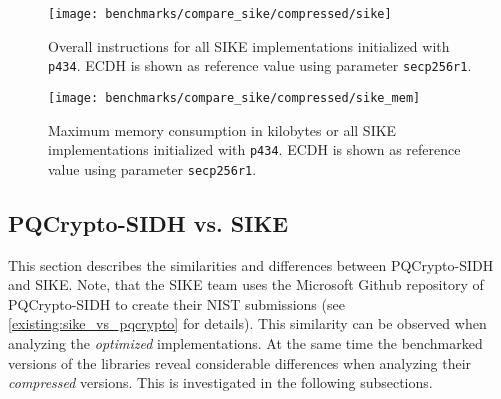 \begin{figure}[H]
  \centering
  \texttt{[image: benchmarks/compare\_sike/compressed/sike]}
  \caption[Instructions  of \gls{SIKE} implementations]
  {Overall instructions for all \gls{SIKE} implementations initialized with \texttt{p434}. \gls{ECDH} is shown as reference value using parameter \texttt{secp256r1}.}
  \label{fig:results_sike}
\end{figure}

\begin{figure}[H]
  \centering
  \texttt{[image: benchmarks/compare\_sike/compressed/sike\_mem]}
  \caption[Memory consumption of \gls{SIKE} implementations]
  {Maximum memory consumption in kilobytes or all \gls{SIKE} implementations initialized with \texttt{p434}. \gls{ECDH} is shown as reference value using parameter \texttt{secp256r1}.}
  \label{fig:results_sike_mem}
\end{figure}

\subsection{\gls{PQCrypto-SIDH} vs. \gls{SIKE}} \label{sec:pqc_vs_sike}

This section describes the similarities and differences between \gls{PQCrypto-SIDH} and \gls{SIKE}. Note, that the \gls{SIKE} team uses the Microsoft Github repository of \gls{PQCrypto-SIDH} to create their \gls{NIST} submissions (see \autoref{existing:sike_vs_pqcrypto} for details). This similarity can be observed when analyzing the \textit{optimized} implementations. At the same time the benchmarked versions of the libraries reveal considerable differences when analyzing their \textit{compressed} versions. This is investigated in the following subsections.

